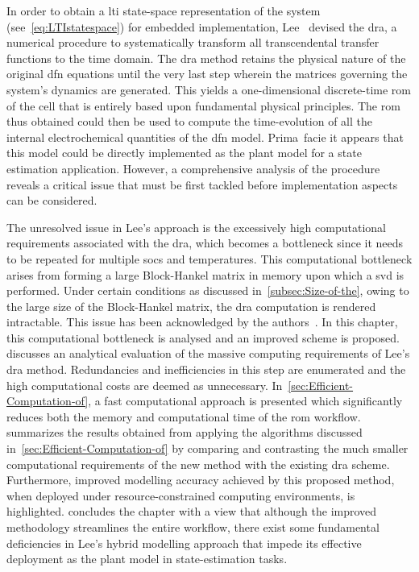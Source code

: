 In  order  to  obtain  a  \gls{lti} state-space  representation  of  the  system
(see~\cref{eq:LTIstatespace}) for  embedded implementation,  Lee~\etal{} devised
the   \gls{dra},  a   numerical  procedure   to  systematically   transform  all
transcendental  transfer functions  to  the time  domain.  The \gls{dra}  method
retains  the physical  nature  of  the original  \gls{dfn}  equations until  the
very  last  step  wherein  the  matrices governing  the  system's  dynamics  are
generated. This  yields a  one-dimensional discrete-time  \gls{rom} of  the cell
that is entirely based upon  fundamental physical principles. The \gls{rom} thus
obtained could  then be used to  compute the time-evolution of  all the internal
electrochemical quantities of  the \gls{dfn} model. Prima~facie  it appears that
this  model  could be  directly  implemented  as the  plant  model  for a  state
estimation  application.  However, a  comprehensive  analysis  of the  procedure
reveals  a critical  issue  that  must be  first  tackled before  implementation
aspects can be considered.

The unresolved  issue in  Lee's approach is  the excessively  high computational
requirements associated  with the  \gls{dra}, which  becomes a  bottleneck since
it  needs  to  be  repeated  for multiple  \glspl{soc}  and  temperatures.  This
computational  bottleneck  arises  from  forming  a  large  Block-Hankel  matrix
in  memory  upon  which  a  \gls{svd} is  performed.  Under  certain  conditions
as  discussed  in~\cref{subsec:Size-of-the}, owing  to  the  large size  of  the
Block-Hankel  matrix, the  \gls{dra} computation  is rendered  intractable. This
issue  has been  acknowledged by  the authors~\cite{Lee2012,Plett2015}.  In this
chapter, this  computational bottleneck  is analysed and  an improved  scheme is
proposed.    discusses  an  analytical  evaluation  of
the  massive  computing requirements  of  Lee's  \gls{dra} method.  Redundancies
and  inefficiencies in  this  step  are enumerated  and  the high  computational
costs are deemed as  unnecessary. In~\cref{sec:Efficient-Computation-of}, a fast
computational  approach  is  presented  which  significantly  reduces  both  the
memory  and computational  time  of the  \gls{rom} workflow.  
summarizes  the   results  obtained  from  applying   the  algorithms  discussed
in~\cref{sec:Efficient-Computation-of}  by comparing  and  contrasting the  much
smaller computational requirements of the new method with the existing \gls{dra}
scheme.  Furthermore,  improved modelling  accuracy  achieved  by this  proposed
method,  when deployed  under  resource-constrained  computing environments,  is
highlighted.    concludes  the  chapter with  a  view  that
although the improved  methodology streamlines the entire  workflow, there exist
some fundamental deficiencies in Lee's hybrid modelling approach that impede its
effective deployment as the plant model in state-estimation tasks.

